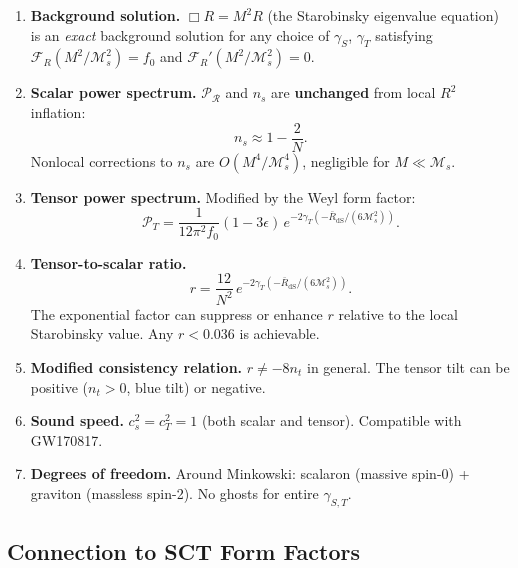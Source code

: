 \documentclass[11pt,a4paper]{article}
\theoremstyle{plain}
\theoremstyle{definition}
\begin{document}
\begin{enumerate}[(1)]
  \item \textbf{Background solution.}
    $\Box R = M^2 R$ (the Starobinsky eigenvalue equation) is an
    \emph{exact} background solution for any choice of $\gamma_S$,
    $\gamma_T$ satisfying $\mathcal{F}_R(M^2/\mathcal{M}_s^2) = f_0$
    and $\mathcal{F}_R'(M^2/\mathcal{M}_s^2) = 0$.

  \item \textbf{Scalar power spectrum.}
    $\mathcal{P}_{\mathcal{R}}$ and $n_s$ are \textbf{unchanged}
    from local $R^2$ inflation:
    \begin{equation}\label{eq:ns-kks}
      n_s \approx 1 - \frac{2}{N}.
    \end{equation}
    Nonlocal corrections to $n_s$ are $O(M^4/\mathcal{M}_s^4)$,
    negligible for $M \ll \mathcal{M}_s$.

  \item \textbf{Tensor power spectrum.}
    Modified by the Weyl form factor:
    \begin{equation}\label{eq:Pt-kks}
      \mathcal{P}_T = \frac{1}{12\pi^2 f_0}
      (1 - 3\epsilon)\,e^{-2\gamma_T(-\bar{R}_{\mathrm{dS}}/(6\mathcal{M}_s^2))}.
    \end{equation}

  \item \textbf{Tensor-to-scalar ratio.}
    \begin{equation}\label{eq:r-kks}
      r = \frac{12}{N^2}\,e^{-2\gamma_T(-\bar{R}_{\mathrm{dS}}/(6\mathcal{M}_s^2))}.
    \end{equation}
    The exponential factor can suppress or enhance $r$ relative to the
    local Starobinsky value. Any $r < 0.036$ is achievable.

  \item \textbf{Modified consistency relation.}
    $r \neq -8n_t$ in general. The tensor tilt can be positive
    ($n_t > 0$, blue tilt) or negative.

  \item \textbf{Sound speed.}
    $c_s^2 = c_T^2 = 1$ (both scalar and tensor). Compatible with
    GW170817.

  \item \textbf{Degrees of freedom.}
    Around Minkowski: scalaron (massive spin-0) + graviton (massless
    spin-2). No ghosts for entire $\gamma_{S,T}$.
\end{enumerate}

\subsection{Connection to SCT Form Factors}
\end{document}
